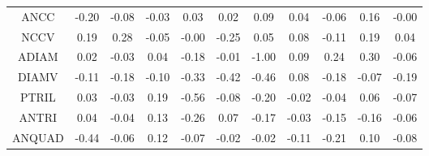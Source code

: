 \documentclass[11pt,a4paper]{report}
\begin{document}
\begin{longtable}{ | c || c | c | c | c | c | c | c | c | c || c |}
ANCC &  \cellcolor[HTML]{FFF7F7} -0.20 &  \cellcolor[HTML]{FFFFFF} -0.08 &  \cellcolor[HTML]{FFFFFF} -0.03 &  \cellcolor[HTML]{FFFFFF} 0.03 &  \cellcolor[HTML]{FFFFFF} 0.02 &  \cellcolor[HTML]{FFFFFF} 0.09 &  \cellcolor[HTML]{FFFFFF} 0.04 &  \cellcolor[HTML]{FFFFFF} -0.06 &  \cellcolor[HTML]{FFFFFF} 0.16 &  \cellcolor[HTML]{FFFFFF} -0.00 \\
NCCV &  \cellcolor[HTML]{F7F7FF} 0.19 &  \cellcolor[HTML]{F7F7FF} 0.28 &  \cellcolor[HTML]{FFFFFF} -0.05 &  \cellcolor[HTML]{FFFFFF} -0.00 &  \cellcolor[HTML]{FFF7F7} -0.25 &  \cellcolor[HTML]{FFFFFF} 0.05 &  \cellcolor[HTML]{FFFFFF} 0.08 &  \cellcolor[HTML]{FFFFFF} -0.11 &  \cellcolor[HTML]{F7F7FF} 0.19 &  \cellcolor[HTML]{FFFFFF} 0.04 \\
ADIAM &  \cellcolor[HTML]{FFFFFF} 0.02 &  \cellcolor[HTML]{FFFFFF} -0.03 &  \cellcolor[HTML]{FFFFFF} 0.04 &  \cellcolor[HTML]{FFF7F7} -0.18 &  \cellcolor[HTML]{FFFFFF} -0.01 &  \cellcolor[HTML]{FFE7E7} -1.00 &  \cellcolor[HTML]{FFFFFF} 0.09 &  \cellcolor[HTML]{F7F7FF} 0.24 &  \cellcolor[HTML]{F7F7FF} 0.30 &  \cellcolor[HTML]{FFFFFF} -0.06 \\
DIAMV &  \cellcolor[HTML]{FFFFFF} -0.11 &  \cellcolor[HTML]{FFF7F7} -0.18 &  \cellcolor[HTML]{FFFFFF} -0.10 &  \cellcolor[HTML]{FFF7F7} -0.33 &  \cellcolor[HTML]{FFF7F7} -0.42 &  \cellcolor[HTML]{FFF7F7} -0.46 &  \cellcolor[HTML]{FFFFFF} 0.08 &  \cellcolor[HTML]{FFF7F7} -0.18 &  \cellcolor[HTML]{FFFFFF} -0.07 &  \cellcolor[HTML]{FFF7F7} -0.19 \\
PTRIL &  \cellcolor[HTML]{FFFFFF} 0.03 &  \cellcolor[HTML]{FFFFFF} -0.03 &  \cellcolor[HTML]{F7F7FF} 0.19 &  \cellcolor[HTML]{FFEFEF} -0.56 &  \cellcolor[HTML]{FFFFFF} -0.08 &  \cellcolor[HTML]{FFF7F7} -0.20 &  \cellcolor[HTML]{FFFFFF} -0.02 &  \cellcolor[HTML]{FFFFFF} -0.04 &  \cellcolor[HTML]{FFFFFF} 0.06 &  \cellcolor[HTML]{FFFFFF} -0.07 \\
ANTRI &  \cellcolor[HTML]{FFFFFF} 0.04 &  \cellcolor[HTML]{FFFFFF} -0.04 &  \cellcolor[HTML]{FFFFFF} 0.13 &  \cellcolor[HTML]{FFF7F7} -0.26 &  \cellcolor[HTML]{FFFFFF} 0.07 &  \cellcolor[HTML]{FFF7F7} -0.17 &  \cellcolor[HTML]{FFFFFF} -0.03 &  \cellcolor[HTML]{FFFFFF} -0.15 &  \cellcolor[HTML]{FFF7F7} -0.16 &  \cellcolor[HTML]{FFFFFF} -0.06 \\
ANQUAD &  \cellcolor[HTML]{FFF7F7} -0.44 &  \cellcolor[HTML]{FFFFFF} -0.06 &  \cellcolor[HTML]{FFFFFF} 0.12 &  \cellcolor[HTML]{FFFFFF} -0.07 &  \cellcolor[HTML]{FFFFFF} -0.02 &  \cellcolor[HTML]{FFFFFF} -0.02 &  \cellcolor[HTML]{FFFFFF} -0.11 &  \cellcolor[HTML]{FFF7F7} -0.21 &  \cellcolor[HTML]{FFFFFF} 0.10 &  \cellcolor[HTML]{FFFFFF} -0.08 \\

\end{longtable}
\end{document}
